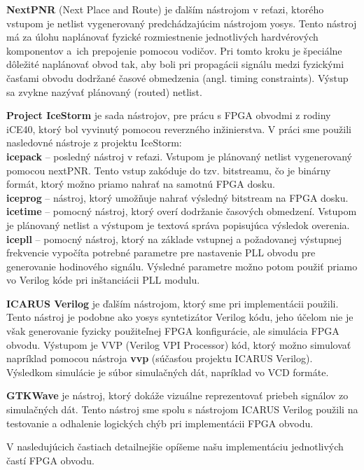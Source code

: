 \textbf{NextPNR} (Next Place and Route) \cite{nextpnr} je ďalším nástrojom v reťazi, ktorého vstupom je netlist vygenerovaný predchádzajúcim nástrojom yosys. Tento nástroj má za úlohu naplánovať fyzické rozmiestnenie jednotlivých hardvérových komponentov a~ich prepojenie pomocou vodičov. Pri tomto kroku je špeciálne dôležité naplánovať obvod tak, aby boli pri propagácii signálu medzi fyzickými časťami obvodu dodržané časové obmedzenia (angl. timing constraints). Výstup sa zvykne nazývať plánovaný (routed) netlist.

\textbf{Project IceStorm} \cite{icestorm} je sada nástrojov, pre prácu s FPGA obvodmi z rodiny iCE40, ktorý bol vyvinutý pomocou reverzného inžinierstva. V práci sme použili nasledovné nástroje z projektu IceStorm:\\
\textbf{icepack} -- posledný nástroj v  reťazi. Vstupom je plánovaný netlist vygenerovaný pomocou nextPNR. Tento vstup zakóduje do tzv. bitstreamu, čo je binárny formát, ktorý možno priamo nahrať na samotnú FPGA dosku.\\
\textbf{iceprog} -- nástroj, ktorý umožňuje nahrať výsledný bitstream na FPGA dosku.\\
\textbf{icetime} -- pomocný nástroj, ktorý overí dodržanie časových obmedzení. Vstupom je plánovaný netlist a výstupom je textová správa popisujúca výsledok overenia.\\
\textbf{icepll} -- pomocný nástroj, ktorý na základe vstupnej a požadovanej výstupnej frekvencie vypočíta potrebné parametre pre nastavenie PLL obvodu pre generovanie hodinového signálu. Výsledné parametre možno potom použiť priamo vo Verilog kóde pri inštanciácii PLL modulu.

\textbf{ICARUS Verilog} \cite{iverilog} je ďalším nástrojom, ktorý sme pri implementácii použili. Tento nástroj je podobne ako yosys syntetizátor Verilog kódu, jeho účelom nie je však generovanie fyzicky použiteľnej FPGA konfigurácie, ale simulácia FPGA obvodu. Výstupom je VVP (Verilog VPI Processor) kód, ktorý možno simulovať napríklad pomocou nástroja \textbf{vvp} (súčasťou projektu ICARUS Verilog). Výsledkom simulácie je súbor simulačných dát, napríklad vo VCD formáte.

\textbf{GTKWave} \cite{gtkwave} je nástroj, ktorý dokáže vizuálne reprezentovať priebeh signálov zo simulačných dát. Tento nástroj sme spolu s nástrojom ICARUS Verilog použili na testovanie a odhalenie logických chýb pri implementácii FPGA obvodu.

V nasledujúcich častiach detailnejšie opíšeme našu implementáciu jednotlivých častí FPGA obvodu.

